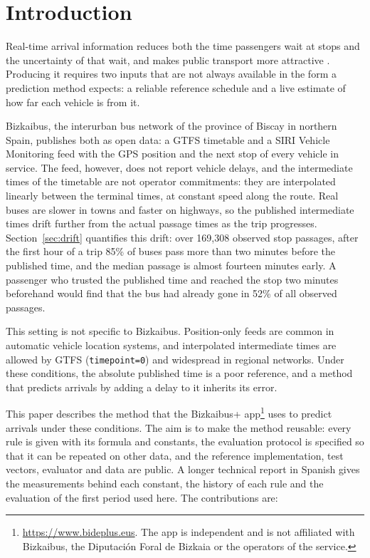 \documentclass[preprint,11pt,nonatbib]{elsarticle}
\begin{document}
\section{Introduction}
\label{sec:intro}

Real-time arrival information reduces both the time passengers wait at stops and the uncertainty of that wait, and
makes public transport more attractive \parencite{watkins2011,brakewood2019}. Producing it requires two inputs that
are not always available in the form a prediction method expects: a reliable reference schedule and a live estimate
of how far each vehicle is from it.

Bizkaibus, the interurban bus network of the province of Biscay in northern Spain, publishes both as open data: a
GTFS timetable \parencite{gtfs} and a SIRI Vehicle Monitoring feed \parencite{siri} with the GPS position and the
next stop of every vehicle in service. The feed, however, does not report vehicle delays, and the intermediate times
of the timetable are not operator commitments: they are interpolated linearly between the terminal times, at
constant speed along the route. Real buses are slower in towns and faster on highways, so the published intermediate
times drift further from the actual passage times as the trip progresses. Section~\ref{sec:drift} quantifies this drift:
over 169,308 observed stop passages, after the first hour of a trip 85\% of buses pass more than two minutes before
the published time, and the median passage is almost fourteen minutes early. A passenger who trusted the published
time and reached the stop two minutes beforehand would find that the bus had already gone in 52\% of all observed passages.

This setting is not specific to Bizkaibus. Position-only feeds are common in automatic vehicle location systems, and
interpolated intermediate times are allowed by GTFS (\texttt{timepoint=0}) and widespread in regional networks. Under
these conditions, the absolute published time is a poor reference, and a method that predicts arrivals by adding a
delay to it inherits its error.

This paper describes the method that the Bizkaibus+ app\footnote{\url{https://www.bideplus.eus}. The app is
independent and is not affiliated with Bizkaibus, the Diputación Foral de Bizkaia or the operators of the service.}
uses to predict arrivals under these conditions. The aim is to make the method reusable: every rule is given with its
formula and constants, the evaluation protocol is specified so that it can be repeated on other data, and the
reference implementation, test vectors, evaluator and data are public. A longer technical report in Spanish
\parencite{garrido2026memoria} gives the measurements behind each constant, the history of each rule and the
evaluation of the first period used here. The contributions are:
\end{document}
